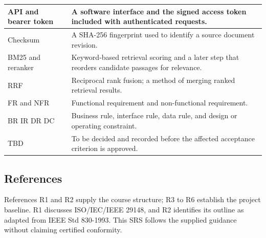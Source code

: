 \documentclass[11pt,letterpaper]{article}
\begin{document}
\begin{longtable}{|P{\arrayrulewidth\relax}|P{\arrayrulewidth\relax}|}
API and bearer token & A software interface and the signed access token included with authenticated requests. \\ \hline

Checksum & A SHA-256 fingerprint used to identify a source document revision. \\ \hline

BM25 and reranker & Keyword-based retrieval scoring and a later step that reorders candidate passages for relevance. \\ \hline

RRF & Reciprocal rank fusion; a method of merging ranked retrieval results. \\ \hline

FR and NFR & Functional requirement and non-functional requirement. \\ \hline

BR IR DR DC & Business rule, interface rule, data rule, and design or operating constraint. \\ \hline

TBD & To be decided and recorded before the affected acceptance criterion is approved. \\ \hline

\end{longtable}

\endgroup

\subsection{References}

References R1 and R2 supply the course structure; R3 to R6 establish the project baseline. R1 discusses ISO/IEC/IEEE 29148, and R2 identifies its outline as adapted from IEEE Std 830-1993. This SRS follows the supplied guidance without claiming certified conformity.\par

\begingroup\small
\end{document}
